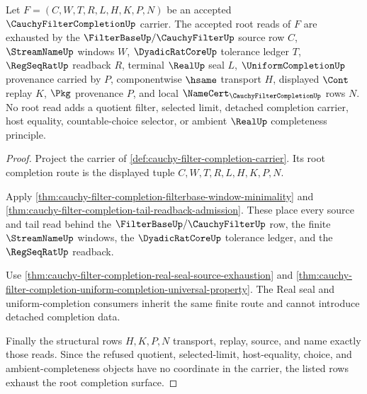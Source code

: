 \begin{theorem}
\label{thm:cauchy-filter-completion-root-exactness}
Let $F=(C,W,T,R,L,H,K,P,N)$ be an accepted $\CauchyFilterCompletionUp$ carrier. The accepted root reads of $F$ are exhausted by the $\FilterBaseUp/\CauchyFilterUp$ source row $C$, $\StreamNameUp$ windows $W$, $\DyadicRatCoreUp$ tolerance ledger $T$, $\RegSeqRatUp$ readback $R$, terminal $\RealUp$ seal $L$, $\UniformCompletionUp$ provenance carried by $P$, componentwise $\hsame$ transport $H$, displayed $\Cont$ replay $K$, $\Pkg$ provenance $P$, and local $\NameCert_{\CauchyFilterCompletionUp}$ rows $N$. No root read adds a quotient filter, selected limit, detached completion carrier, host equality, countable-choice selector, or ambient $\RealUp$ completeness principle.
\end{theorem}
\begin{proof}
Project the carrier of \autoref{def:cauchy-filter-completion-carrier}. Its root completion route is the displayed tuple $C,W,T,R,L,H,K,P,N$.

Apply \autoref{thm:cauchy-filter-completion-filterbase-window-minimality} and \autoref{thm:cauchy-filter-completion-tail-readback-admission}. These place every source and tail read behind the $\FilterBaseUp/\CauchyFilterUp$ row, the finite $\StreamNameUp$ windows, the $\DyadicRatCoreUp$ tolerance ledger, and the $\RegSeqRatUp$ readback.

Use \autoref{thm:cauchy-filter-completion-real-seal-source-exhaustion} and \autoref{thm:cauchy-filter-completion-uniform-completion-universal-property}. The Real seal and uniform-completion consumers inherit the same finite route and cannot introduce detached completion data.

Finally the structural rows $H,K,P,N$ transport, replay, source, and name exactly those reads. Since the refused quotient, selected-limit, host-equality, choice, and ambient-completeness objects have no coordinate in the carrier, the listed rows exhaust the root completion surface.
\end{proof}
